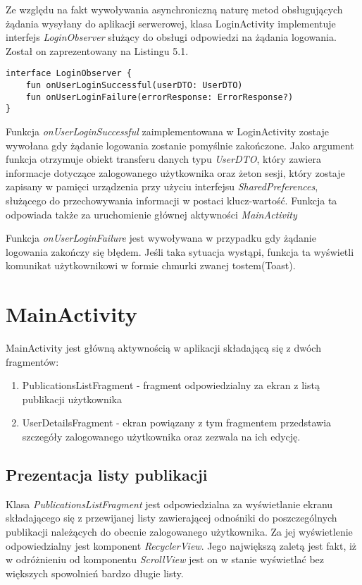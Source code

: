 \documentclass[a4paper,12pt,twoside,openany]{report}
\begin{document}
 Ze względu na fakt wywoływania asynchroniczną naturę metod obsługujących żądania wysyłany do aplikacji serwerowej, klasa LoginActivity implementuje interfejs \textit{LoginObserver} służący do obsługi odpowiedzi na żądania logowania. Został on zaprezentowany na Listingu 5.1.
 \begin{lstlisting}[caption=Interfejs LoginObserver,label=code1,captionpos=b]
interface LoginObserver {
	fun onUserLoginSuccessful(userDTO: UserDTO)  
	fun onUserLoginFailure(errorResponse: ErrorResponse?)
}
 \end{lstlisting} 


Funkcja \textit{onUserLoginSuccessful} zaimplementowana w LoginActivity zostaje wywołana gdy żądanie logowania zostanie pomyślnie zakończone. Jako argument funkcja otrzymuje obiekt transferu danych typu \textit{UserDTO}, który zawiera informacje dotyczące zalogowanego użytkownika oraz żeton sesji, który zostaje zapisany w pamięci urządzenia przy użyciu interfejsu \textit{SharedPreferences}, służącego do przechowywania informacji w postaci klucz-wartość. Funkcja ta odpowiada także za uruchomienie głównej aktywności \textit{MainActivity}

Funkcja \textit{onUserLoginFailure} jest wywoływana w przypadku gdy żądanie logowania zakończy się błędem. Jeśli taka sytuacja wystąpi, funkcja ta wyświetli komunikat użytkownikowi w formie chmurki zwanej tostem(Toast).

\section{MainActivity}
MainActivity jest główną aktywnością w aplikacji składającą się z dwóch fragmentów: 
\begin{enumerate}
	\item PublicationsListFragment - fragment odpowiedzialny za ekran z listą publikacji użytkownika
	\item UserDetailsFragment - ekran powiązany z tym fragmentem przedstawia szczegóły zalogowanego użytkownika oraz zezwala na ich edycję.
\end{enumerate}

\subsection{Prezentacja listy publikacji}
Klasa \textit{PublicationsListFragment} jest odpowiedzialna za wyświetlanie ekranu składającego się z przewijanej listy zawierającej odnośniki do poszczególnych publikacji należących do obecnie zalogowanego użytkownika. Za jej wyświetlenie odpowiedzialny jest komponent \textit{RecyclerView}. Jego największą zaletą jest fakt, iż w odróżnieniu od komponentu \textit{ScrollView} jest on w stanie wyświetlać bez większych spowolnień bardzo długie listy. 
\end{document}
